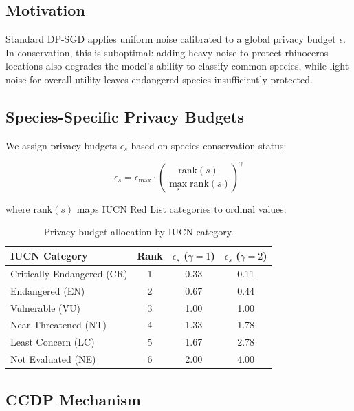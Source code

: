 \documentclass[11pt,a4paper]{article}
\begin{document}
\subsection{Motivation}

Standard DP-SGD \citep{abadi2016deep} applies uniform noise calibrated to a global privacy budget $\epsilon$.
In conservation, this is suboptimal: adding heavy noise to protect rhinoceros locations also degrades the model's ability to classify common species, while light noise for overall utility leaves endangered species insufficiently protected.

\subsection{Species-Specific Privacy Budgets}

We assign privacy budgets $\epsilon_s$ based on species conservation status:

\begin{equation}
    \epsilon_s = \epsilon_{\max} \cdot \left(\frac{\text{rank}(s)}{\max_s \text{rank}(s)}\right)^\gamma
\end{equation}

\noindent where $\text{rank}(s)$ maps IUCN Red List categories to ordinal values:

\begin{table}[H]
\centering
\caption{Privacy budget allocation by IUCN category.}
\label{tab:privacy_budgets}
\begin{tabular}{@{}lccc@{}}
\toprule
\textbf{IUCN Category} & \textbf{Rank} & $\epsilon_s$ ($\gamma=1$) & $\epsilon_s$ ($\gamma=2$) \\
\midrule
Critically Endangered (CR) & 1 & 0.33 & 0.11 \\
Endangered (EN) & 2 & 0.67 & 0.44 \\
Vulnerable (VU) & 3 & 1.00 & 1.00 \\
Near Threatened (NT) & 4 & 1.33 & 1.78 \\
Least Concern (LC) & 5 & 1.67 & 2.78 \\
Not Evaluated (NE) & 6 & 2.00 & 4.00 \\
\bottomrule
\end{tabular}
\end{table}

\subsection{CCDP Mechanism}
\end{document}
